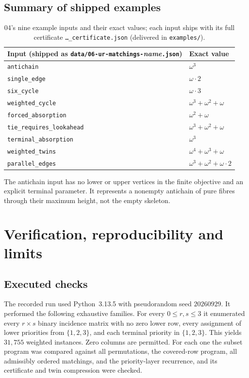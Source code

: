 \documentclass[11pt,a4paper]{article}
\theoremstyle{definition}
\theoremstyle{remark}
\begin{document}
\subsection{Summary of shipped examples}
\begin{table}[htbp]
\centering\small
\begin{tabularx}{\linewidth}{@{}lX@{}}
\toprule
Input (shipped as \texttt{data/06-ur-matchings-}\emph{name}\texttt{.json}) & Exact value\\
\midrule
\texttt{antichain} & $\omega^3$\\
\texttt{single\_edge} & $\omega\cdot2$\\
\texttt{six\_cycle} & $\omega\cdot3$\\
\texttt{weighted\_cycle} & $\omega^3+\omega^2+\omega$\\
\texttt{forced\_absorption} & $\omega^2+\omega$\\
\texttt{tie\_requires\_lookahead} & $\omega^3+\omega^2+\omega$\\
\texttt{terminal\_absorption} & $\omega^3$\\
\texttt{weighted\_twins} & $\omega^4+\omega^3+\omega$\\
\texttt{parallel\_edges} & $\omega^3+\omega^2+\omega\cdot2$\\
\bottomrule
\end{tabularx}
\caption{04's nine example inputs and their exact values; each input ships
with its full certificate \texttt{\ldots\_certificate.json} (delivered in
\texttt{examples/}).}
\label{nh:ur:tab:examples}
\end{table}
The antichain input has no lower or upper vertices in the finite objective and
an explicit terminal parameter. It represents a nonempty antichain of pure
fibres through their maximum height, not the empty skeleton.

\section{Verification, reproducibility and limits}\label{nh:ur:sec:verification}
\setcounter{equation}{0}

\subsection{Executed checks}
The recorded run used Python~3.13.5 with pseudorandom seed $20260929$. It
performed the following exhaustive families. For every $0\le r,s\le3$ it
enumerated every $r\times s$ binary incidence matrix with no zero lower row,
every assignment of lower priorities from $\{1,2,3\}$, and each terminal
priority in $\{1,2,3\}$. This yields $31{,}755$ weighted instances. Zero
columns are permitted. For each one the subset program was compared against
all permutations, the covered-row program, all admissibly ordered matchings,
and the priority-layer recurrence, and its certificate and twin compression
were checked.
\end{document}
